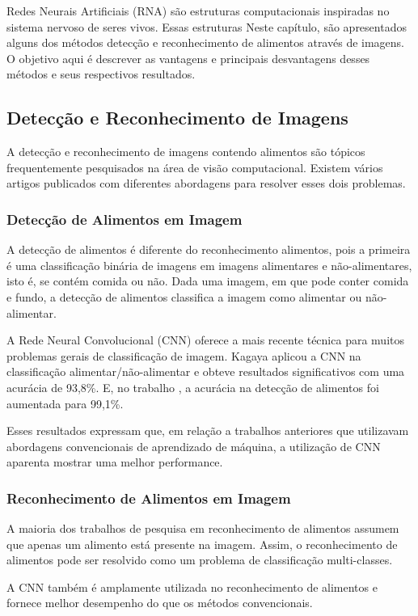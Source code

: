 Redes Neurais Artificiais (RNA) são estruturas computacionais inspiradas no sistema nervoso de seres vivos. Essas estruturas
Neste capítulo, são apresentados alguns dos métodos detecção e reconhecimento de alimentos através de imagens. O objetivo aqui é descrever as vantagens e principais desvantagens desses métodos e seus respectivos resultados. 


\subsection{Detecção e Reconhecimento de Imagens}
A detecção e reconhecimento de imagens contendo alimentos são tópicos frequentemente pesquisados na área de visão computacional. Existem vários artigos publicados com diferentes abordagens para resolver esses dois problemas.  

\subsubsection{Detecção de Alimentos em Imagem}
A detecção de alimentos é diferente do reconhecimento alimentos, pois a primeira é uma classificação binária de imagens em imagens alimentares e não-alimentares, isto é, se contém comida ou não. Dada uma imagem, em que pode conter comida e fundo, a detecção de alimentos classifica a imagem como alimentar ou não-alimentar.

A Rede Neural Convolucional (CNN) oferece a mais recente técnica para muitos problemas gerais de classificação de imagem. Kagaya \cite{kagaya2014food} aplicou a CNN na classificação alimentar/não-alimentar e obteve resultados significativos com uma acurácia de 93,8\%. E, no trabalho \cite{kagaya2015highly}, a acurácia na detecção de alimentos foi aumentada para 99,1\%.

Esses resultados expressam que, em relação a trabalhos anteriores que utilizavam abordagens convencionais de aprendizado de máquina, a utilização de CNN aparenta mostrar uma melhor performance.

\subsubsection{Reconhecimento de Alimentos em Imagem}
A maioria dos trabalhos de pesquisa em reconhecimento de alimentos assumem que apenas um alimento está presente na imagem. Assim, o reconhecimento de alimentos pode ser resolvido como um problema de classificação multi-classes. 

A CNN também é amplamente utilizada no reconhecimento de alimentos e fornece melhor desempenho do que os métodos convencionais. 

